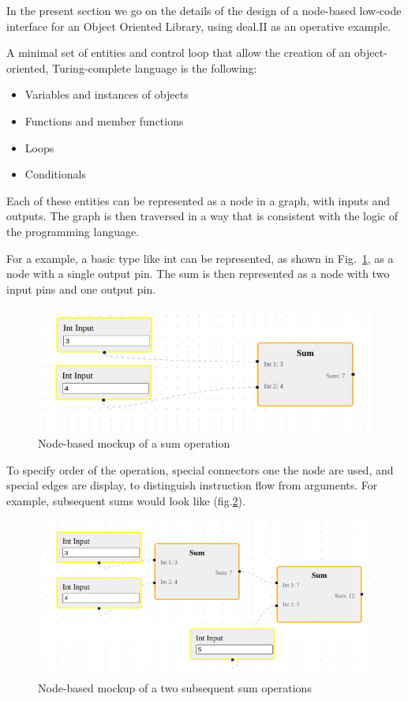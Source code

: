 \documentclass[a4paper,12pt]{article}
\begin{document}
In the present section we go on the details of the design of a node-based low-code interface for an Object Oriented Library, using deal.II as an operative example.

A minimal set of entities and control loop that allow the creation of an object-oriented, Turing-complete language is the following:
\begin{itemize}
\item Variables and instances of objects
\item Functions and member functions
\item Loops
\item Conditionals
\end{itemize}

Each of these entities can be represented as a node in a graph, with inputs and outputs. The graph is then traversed in a way that is consistent with the logic of the programming language.

For a example, a basic type like int can be represented, as shown in Fig.~\ref{sum}, as a node with a single output pin. The sum is then represented as a node with two input pins and one output pin. 

\begin{figure}
    \includegraphics[width=400pt]{sum.png}
    \caption{Node-based mockup of a sum operation}
    \label{sum}
\end{figure}

To specify order of the operation, special connectors one the node are used, and special edges are display, to distinguish instruction flow from arguments. For example, subsequent sums would look like (fig.\ref{twosum}).

\begin{figure}
    \label{twosum}
    \includegraphics[width=400pt]{twosum.png}
    \caption{Node-based mockup of a two subsequent sum operations}
\end{figure}
    
\end{document}

